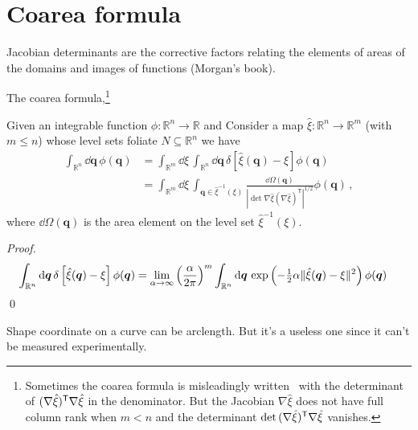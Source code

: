 \section{Coarea formula}

Jacobian determinants are the corrective factors relating the elements of areas of the domains and images of functions (Morgan's book).

The coarea formula,\footnote{Sometimes the coarea formula is misleadingly written~\cite{hartmann2007,hartmann2007a} with the determinant of $(\nabla\hat{\xi})^\mathsf{T}\nabla\hat{\xi}$ in the denominator.  But the Jacobian $\nabla\hat{\xi}$ does not have full column rank when $m < n$ and the determinant $\det\,(\nabla\hat{\xi})^\mathsf{T}\nabla\hat{\xi}$ vanishes.}
%
\begin{theorem}
  Given an integrable function $\phi: \mathbb{R}^n \to \mathbb{R}$ and
  Consider a map $\hat{\xi}: \mathbb{R}^n \to \mathbb{R}^m$ (with $m \leq n$) whose level sets foliate $N \subseteq \mathbb{R}^{n}$ we have
  \begin{equation}
    \begin{aligned}
      \int_{\mathbb{R}^n} \dd{\bm{q}}\, \phi(\bm{q}) &= \int_{\mathbb{R}^m} \dd{\xi}\,\int_{\mathbb{R}^n} \dd{\bm{q}}\, \delta\left[\hat{\xi}(\bm{q}) - \xi\right] \phi(\bm{q})\\
                                                     &= \int_{\mathbb{R}^m} \dd{\xi}\,\int_{\bm{q} \in \hat{\xi}^{-1}(\xi)} \frac{\dd{\Omega(\bm{q})}}{|\det \nabla\hat{\xi}(\nabla\hat{\xi})^\mathsf{T}|^{1/2}} \phi(\bm{q})\,,
    \end{aligned}
  \end{equation}
  where $\dd\Omega(\bm{q})$ is the area element on the level set $\hat{\xi}^{-1}(\xi)$.
\end{theorem}
\begin{proof}
  \begin{equation}
    \begin{aligned}
      \int_{\mathbb{R}^{n}} \mathrm{d}\bm{q}\,\delta\left[\hat{\xi}(\bm{q}) - \xi\right] \phi(\bm{q}) &=
      \lim_{\alpha \to \infty} \left(\frac{\alpha}{2\pi}\right)^{m} \int_{\mathbb{R}^{n}} \mathrm{d}\bm{q}\, \exp\left(-\tfrac{1}{2}\alpha\lVert\hat{\xi}(\bm{q}) - \xi\rVert^{2}\right) \phi(\bm{q})
    \end{aligned}
  \end{equation}
  \qed
\end{proof}

Shape coordinate on a curve can be arclength.  But it's a useless one since it can't be measured experimentally.

